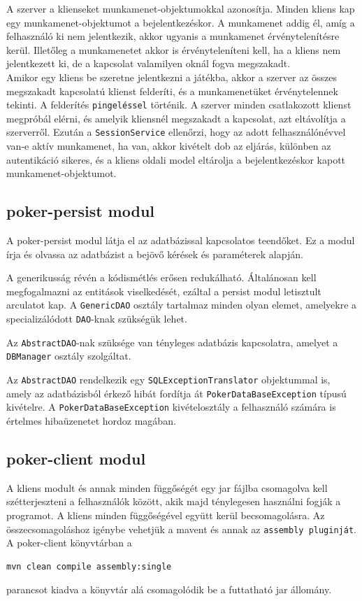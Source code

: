 A szerver a klienseket munkamenet-objektumokkal azonosítja. Minden kliens kap egy munkamenet-objektumot a bejelentkezéskor. A munkamenet addig él, amíg a felhasználó ki nem jelentkezik, akkor ugyanis a munkamenet érvénytelenítésre kerül. Illetőleg a munkamenetet akkor is érvényteleníteni kell, ha a kliens nem jelentkezett ki, de a kapcsolat valamilyen oknál fogva megszakadt. \\
Amikor egy kliens be szeretne jelentkezni a játékba, akkor a szerver az összes megszakadt kapcsolatú klienst felderíti, és a munkamenetüket érvénytelennek tekinti. A felderítés \texttt{pingeléssel} történik. A szerver minden csatlakozott klienst megpróbál elérni, és amelyik kliensnél megszakadt a kapcsolat, azt eltávolítja a szerverről. Ezután a \texttt{SessionService} ellenőrzi, hogy az adott felhasználónévvel van-e aktív munkamenet, ha van, akkor kivételt dob az eljárás, különben az autentikáció sikeres, és a kliens oldali model eltárolja a bejelentkezéskor kapott munkamenet-objektumot.

\subsection{poker-persist modul}
A poker-persist modul látja el az adatbázissal kapcsolatos teendőket. Ez a modul írja és olvassa az adatbázist a bejövő kérések és paraméterek alapján.

A generikusság révén a kódismétlés erősen redukálható. Általánosan kell megfogalmazni az entitások viselkedését, ezáltal a persist modul letisztult arculatot kap. A \texttt{GenericDAO} osztály tartalmaz minden olyan elemet, amelyekre a specializálódott \texttt{DAO}-knak szükségük lehet.

Az \texttt{AbstractDAO}-nak szüksége van tényleges adatbázis kapcsolatra, amelyet a \texttt{DBManager} osztály szolgáltat.

Az \texttt{AbstractDAO} rendelkezik egy \texttt{SQLExceptionTranslator} objektummal is, amely az adatbázisból érkező hibát fordítja át \texttt{PokerDataBaseException} típusú kivételre. A \texttt{PokerDataBaseException} kivételosztály a felhasználó számára is értelmes hibaüzenetet hordoz magában.

\subsection{poker-client modul}
A kliens modult és annak minden függőségét egy jar fájlba csomagolva kell szétterjeszteni a felhasználók között, akik majd ténylegesen használni fogják a programot. A kliens minden függőségével együtt kerül becsomagolásra. Az összecsomagoláshoz igénybe vehetjük a mavent és annak az \texttt{assembly pluginját}. A poker-client könyvtárban a
 \begin{Verbatim}[xleftmargin=.5in]
mvn clean compile assembly:single
\end{Verbatim}
parancsot kiadva a  könyvtár alá csomagolódik be a futtatható jar állomány.

